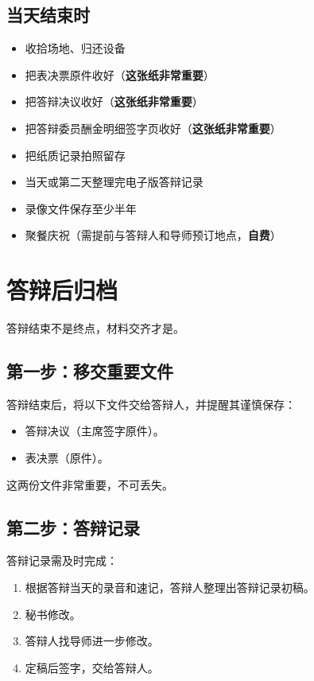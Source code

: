 \documentclass[12pt,a4paper,openany]{ctexbook}
\newcommand{\todoitem}[1]{\item[\textcolor{lzublue}{$\square$}] #1}
\newcommand{\important}[1]{\textbf{\color{red}#1}}
\begin{document}
\section{当天结束时}

\begin{itemize}
  \todoitem{收拾场地、归还设备}
  \todoitem{把表决票原件收好（\important{这张纸非常重要}）}
  \todoitem{把答辩决议收好（\important{这张纸非常重要}）}
  \todoitem{把答辩委员酬金明细签字页收好（\important{这张纸非常重要}）}
  \todoitem{把纸质记录拍照留存}
  \todoitem{当天或第二天整理完电子版答辩记录}
  \todoitem{录像文件保存至少半年}
  \todoitem{聚餐庆祝（需提前与答辩人和导师预订地点，\important{自费}）}
\end{itemize}

\chapter{答辩后归档}

\begin{tipbox}
答辩结束不是终点，材料交齐才是。
\end{tipbox}

\section{第一步：移交重要文件}

答辩结束后，将以下文件交给答辩人，并提醒其谨慎保存：

\begin{itemize}
  \item 答辩决议（主席签字原件）。
  \item 表决票（原件）。
\end{itemize}

\begin{warnbox}
这两份文件非常重要，不可丢失。
\end{warnbox}

\section{第二步：答辩记录}

答辩记录需及时完成：

\begin{enumerate}
  \item 根据答辩当天的录音和速记，答辩人整理出答辩记录初稿。
  \item 秘书修改。
  \item 答辩人找导师进一步修改。
  \item 定稿后签字，交给答辩人。
\end{enumerate}
\end{document}
